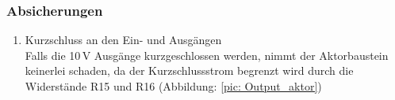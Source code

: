 \subsubsection{Absicherungen}
\begin{enumerate}
	\item Kurzschluss an den Ein- und Ausgängen\\
	Falls die 10\,V Ausgänge kurzgeschlossen werden, nimmt der Aktorbaustein keinerlei schaden, da der Kurzschlussstrom begrenzt wird durch die Widerstände R15 und R16 (Abbildung: \ref{pic: Output_aktor}) 
\end{enumerate}